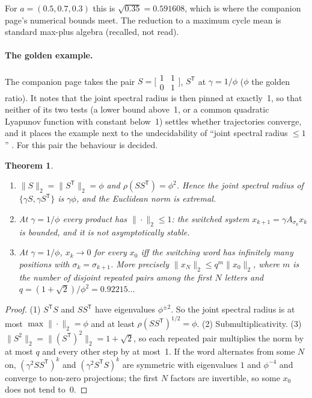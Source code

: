 \documentclass[11pt]{amsart}
\newtheorem{theorem}{Theorem}[section]
\theoremstyle{remark}
\begin{document}
For $a=(0.5,0.7,0.3)$ this is $\sqrt{0.35}=0.591608$, which is where the companion page's numerical
bounds meet. The reduction to a maximum cycle mean is standard max-plus algebra (recalled, not read).

\paragraph{The golden example.} The companion page \cite{roadmap} takes the pair
$S=\bigl[\begin{smallmatrix}1&1\\0&1\end{smallmatrix}\bigr]$, $S^{\mathsf T}$ at $\gamma=1/\phi$
($\phi$ the golden ratio). It notes that the joint spectral radius is then pinned at exactly~1, so
that neither of its two tests (a lower bound above~1, or a common quadratic Lyapunov function with
constant below~1) settles whether trajectories converge, and it places the example next to the
undecidability of ``joint spectral radius $\le1$'' \cite{BT00}. For this pair the behaviour is
decided.

\begin{theorem}\label{ti:thm:R5}
\begin{enumerate}
\item $\|S\|_2=\|S^{\mathsf T}\|_2=\phi$ and $\rho(SS^{\mathsf T})=\phi^2$. Hence the joint spectral
  radius of $\{\gamma S,\gamma S^{\mathsf T}\}$ is $\gamma\phi$, and the Euclidean norm is extremal.
\item At $\gamma=1/\phi$ every product has $\|\cdot\|_2\le1$: the switched system
  $x_{k+1}=\gamma A_{\sigma_k}x_k$ is bounded, and it is not asymptotically stable.
\item At $\gamma=1/\phi$, $x_k\to0$ for every $x_0$ iff the switching word has infinitely many
  positions with $\sigma_k=\sigma_{k+1}$. More precisely $\|x_N\|_2\le q^m\|x_0\|_2$, where $m$ is the
  number of disjoint repeated pairs among the first $N$ letters and $q=(1+\sqrt2)/\phi^2=0.92215\ldots$
\end{enumerate}
\end{theorem}

\begin{proof}
(1) $S^{\mathsf T}S$ and $SS^{\mathsf T}$ have eigenvalues $\phi^{\pm2}$. So the joint spectral
radius is at most $\max\|\cdot\|_2=\phi$ and at least $\rho(SS^{\mathsf T})^{1/2}=\phi$. (2)
Submultiplicativity. (3) $\|S^2\|_2=\|(S^{\mathsf T})^2\|_2=1+\sqrt2$, so each repeated pair multiplies
the norm by at most $q$ and every other step by at most~1. If the word alternates from some $N$ on,
$(\gamma^2SS^{\mathsf T})^k$ and $(\gamma^2S^{\mathsf T}S)^k$ are symmetric with eigenvalues $1$ and
$\phi^{-4}$ and converge to non-zero projections; the first $N$ factors are invertible, so some $x_0$
does not tend to~0.
\end{proof}
\end{document}
